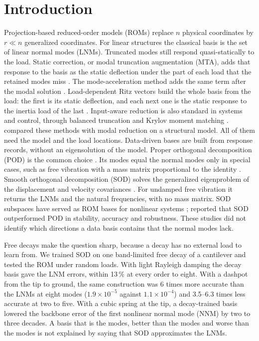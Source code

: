 \documentclass[preprint,12pt]{elsarticle}
\begin{document}
\section{Introduction}\label{sec:intro}
Projection-based reduced-order models (ROMs) replace $n$ physical coordinates by $r\ll n$ generalized coordinates.
For linear structures the classical basis is the set of linear normal modes (LNMs).
Truncated modes still respond quasi-statically to the load. Static correction, or modal truncation augmentation (MTA), adds that response to the basis as the static deflection under the part of each load that the retained modes miss \citep{Dickens1997}. The mode-acceleration method adds the same term after the modal solution \citep{Cornwell1983}.
Load-dependent Ritz vectors build the whole basis from the load: the first is its static deflection, and each next one is the static response to the inertia load of the last \citep{Wilson1982}.
Input-aware reduction is also standard in systems and control, through balanced truncation \citep{Moore1981} and Krylov moment matching \citep{Bai2002}. \citet{Besselink2013} compared these methods with modal reduction on a structural model.
All of them need the model and the load locations.
Data-driven bases are built from response records, without an eigensolution of the model. Proper orthogonal decomposition (POD) is the common choice \citep{Kerschen2005}. Its modes equal the normal modes only in special cases, such as free vibration with a mass matrix proportional to the identity \citep{Feeny1998}.
Smooth orthogonal decomposition (SOD) solves the generalized eigenproblem of the displacement and velocity covariances \citep{Chelidze2006,Farooq2008}. For undamped free vibration it returns the LNMs and the natural frequencies, with no mass matrix.
SOD subspaces have served as ROM bases for nonlinear systems \citep{Segala2015,Ilbeigi2017,Ilbeigi2018}; \citet{Ilbeigi2017} reported that SOD outperformed POD in stability, accuracy and robustness.
These studies did not identify which directions a data basis contains that the normal modes lack.

Free decays make the question sharp, because a decay has no external load to learn from. We trained SOD on one band-limited free decay of a cantilever and tested the ROM under random loads.
With light Rayleigh damping the decay basis gave the LNM errors, within 13\,\% at every order to eight.
With a dashpot from the tip to ground, the same construction was 6 times more accurate than the LNMs at eight modes ($1.9\times10^{-5}$ against $1.1\times10^{-4}$) and 3.5--6.3 times less accurate at two to five.
With a cubic spring at the tip, a decay-trained basis lowered the backbone error of the first nonlinear normal mode (NNM) by two to three decades.
A basis that is the modes, better than the modes and worse than the modes is not explained by saying that SOD approximates the LNMs.
\end{document}
